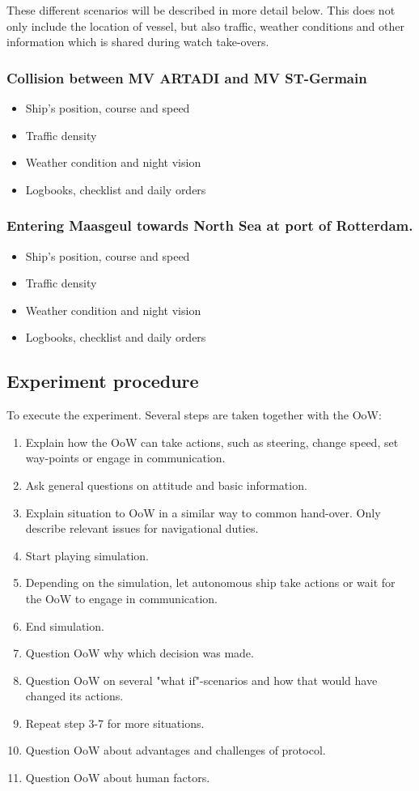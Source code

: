 These different scenarios will be described in more detail below. This does not only include the location of vessel, but also traffic, weather conditions and other information which is shared during watch take-overs.


\subsubsection{Collision between MV ARTADI and MV ST-Germain}
\begin{itemize}
	\item Ship's position, course and speed
	\item Traffic density
	\item Weather condition and night vision
	\item Logbooks, checklist and daily orders
\end{itemize}

\subsubsection{Entering Maasgeul towards North Sea at port of Rotterdam.}
\begin{itemize}
	\item Ship's position, course and speed
	\item Traffic density
	\item Weather condition and night vision
	\item Logbooks, checklist and daily orders
\end{itemize}

\subsection{Experiment procedure}
To execute the experiment. Several steps are taken together with the \acf{OoW}:
\begin{enumerate}
	\item Explain how the OoW can take actions, such as steering, change speed, set way-points or engage in communication.
	\item Ask general questions on attitude and basic information.
	\item Explain situation to OoW in a similar way to common hand-over. Only describe relevant issues for navigational duties.
	\item Start playing simulation.
	\item Depending on the simulation, let autonomous ship take actions or wait for the OoW to engage in communication.
	\item End simulation.
	\item Question OoW why which decision was made.
	\item Question OoW on several "what if"-scenarios and how that would have changed its actions.
	\item Repeat step 3-7 for more situations.
	\item Question OoW about advantages and challenges of protocol.
	\item Question OoW about human factors.
\end{enumerate}

